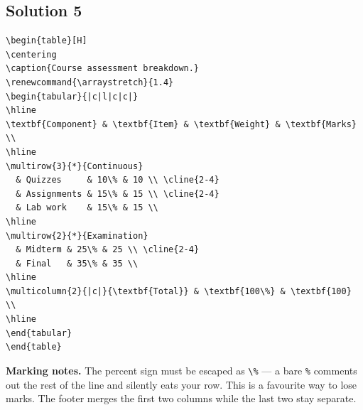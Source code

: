 \documentclass[11pt]{article}
\begin{document}
\subsection*{Solution 5}
\begin{lstlisting}[style=tex]
\begin{table}[H]
\centering
\caption{Course assessment breakdown.}
\renewcommand{\arraystretch}{1.4}
\begin{tabular}{|c|l|c|c|}
\hline
\textbf{Component} & \textbf{Item} & \textbf{Weight} & \textbf{Marks} \\
\hline
\multirow{3}{*}{Continuous}
  & Quizzes     & 10\% & 10 \\ \cline{2-4}
  & Assignments & 15\% & 15 \\ \cline{2-4}
  & Lab work    & 15\% & 15 \\
\hline
\multirow{2}{*}{Examination}
  & Midterm & 25\% & 25 \\ \cline{2-4}
  & Final   & 35\% & 35 \\
\hline
\multicolumn{2}{|c|}{\textbf{Total}} & \textbf{100\%} & \textbf{100} \\
\hline
\end{tabular}
\end{table}
\end{lstlisting}
\textbf{Marking notes.} The percent sign must be escaped as \verb|\%| --- a bare
\texttt{\%} comments out the rest of the line and silently eats your row. This
is a favourite way to lose marks. The footer merges the first two columns while
the last two stay separate.

\end{document}
